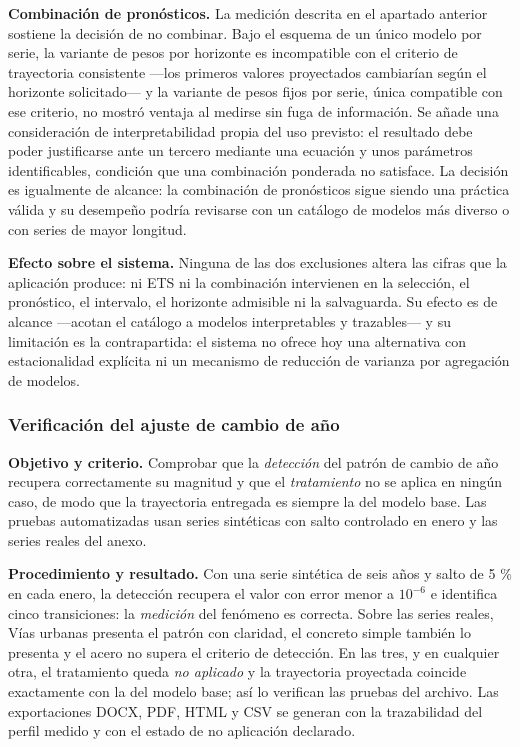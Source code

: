 \documentclass[12pt,letterpaper]{article}
\begin{document}
\textbf{Combinación de pronósticos.} La medición descrita en el apartado anterior sostiene la decisión de no combinar. Bajo el esquema de un único modelo por serie, la variante de pesos por horizonte es incompatible con el criterio de trayectoria consistente ---los primeros valores proyectados cambiarían según el horizonte solicitado--- y la variante de pesos fijos por serie, única compatible con ese criterio, no mostró ventaja al medirse sin fuga de información. Se añade una consideración de interpretabilidad propia del uso previsto: el resultado debe poder justificarse ante un tercero mediante una ecuación y unos parámetros identificables, condición que una combinación ponderada no satisface. La decisión es igualmente de alcance: la combinación de pronósticos sigue siendo una práctica válida y su desempeño podría revisarse con un catálogo de modelos más diverso o con series de mayor longitud.

\textbf{Efecto sobre el sistema.} Ninguna de las dos exclusiones altera las cifras que la aplicación produce: ni ETS ni la combinación intervienen en la selección, el pronóstico, el intervalo, el horizonte admisible ni la salvaguarda. Su efecto es de alcance ---acotan el catálogo a modelos interpretables y trazables--- y su limitación es la contrapartida: el sistema no ofrece hoy una alternativa con estacionalidad explícita ni un mecanismo de reducción de varianza por agregación de modelos.

\subsubsection{Verificación del ajuste de cambio de año}

\textbf{Objetivo y criterio.} Comprobar que la \emph{detección} del patrón de cambio de año recupera correctamente su magnitud y que el \emph{tratamiento} no se aplica en ningún caso, de modo que la trayectoria entregada es siempre la del modelo base. Las pruebas automatizadas usan series sintéticas con salto controlado en enero y las series reales del anexo.

\textbf{Procedimiento y resultado.} Con una serie sintética de seis años y salto de 5 \% en cada enero, la detección recupera el valor con error menor a \(10^{-6}\) e identifica cinco transiciones: la \emph{medición} del fenómeno es correcta. Sobre las series reales, Vías urbanas presenta el patrón con claridad, el concreto simple también lo presenta y el acero no supera el criterio de detección. En las tres, y en cualquier otra, el tratamiento queda \emph{no aplicado} y la trayectoria proyectada coincide exactamente con la del modelo base; así lo verifican las pruebas del archivo. Las exportaciones DOCX, PDF, HTML y CSV se generan con la trazabilidad del perfil medido y con el estado de no aplicación declarado.
\end{document}
